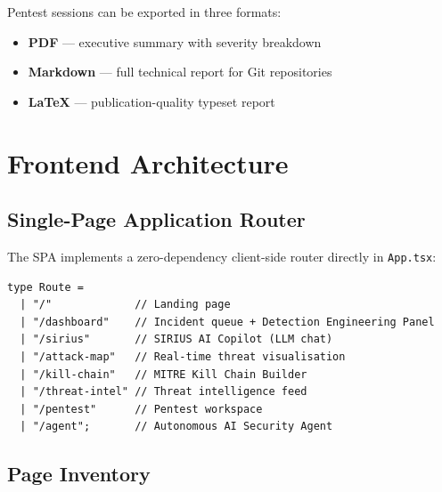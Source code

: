 \documentclass[12pt,a4paper]{article}
\begin{document}
Pentest sessions can be exported in three formats:
\begin{itemize}[noitemsep]
  \item \textbf{PDF} --- executive summary with severity breakdown
  \item \textbf{Markdown} --- full technical report for Git repositories
  \item \textbf{\LaTeX{}} --- publication-quality typeset report
\end{itemize}

\section{Frontend Architecture}

\subsection{Single-Page Application Router}

The SPA implements a zero-dependency client-side router directly in \texttt{App.tsx}:

\begin{lstlisting}[style=tsstyle, caption=SPA route type in App.tsx]
type Route =
  | "/"             // Landing page
  | "/dashboard"    // Incident queue + Detection Engineering Panel
  | "/sirius"       // SIRIUS AI Copilot (LLM chat)
  | "/attack-map"   // Real-time threat visualisation
  | "/kill-chain"   // MITRE Kill Chain Builder
  | "/threat-intel" // Threat intelligence feed
  | "/pentest"      // Pentest workspace
  | "/agent";       // Autonomous AI Security Agent
\end{lstlisting}

\subsection{Page Inventory}
\end{document}
